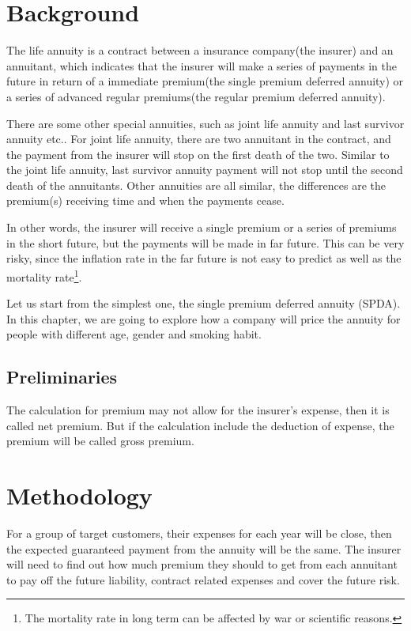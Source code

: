\documentclass{report}
\begin{document}
\section{Background}

The life annuity is a contract between a insurance company(the insurer) and an annuitant\cite{bib:annuity-def}, which indicates that the insurer will make a series of payments in the future in return of a immediate premium(the single premium deferred annuity) or a series of advanced regular premiums(the regular premium deferred annuity). 


There are some other special annuities, such as joint life annuity and last survivor annuity etc.. For joint life annuity, there are two annuitant in the contract, and the payment from the insurer will stop on the first death of the two. Similar to the joint life annuity, last survivor annuity payment will not stop until the second death of the annuitants. Other annuities are all similar, the differences are the premium(s) receiving time and when the payments cease. 


In other words, the insurer will receive a single premium or a series of premiums in the short future, but the payments will be made in far future. This can be very risky, since the inflation rate in the far future is not easy to predict as well as the mortality rate\footnote{The mortality rate in long term can be affected by war or scientific reasons.}.

Let us start from the simplest one, the single premium deferred annuity (SPDA). In this chapter, we are going to explore how a company will price the annuity for people with different age, gender and smoking habit.


\subsection{Preliminaries}

The calculation for premium may not allow for the insurer's expense, then it is called net premium. But if the calculation include the deduction of expense, the premium will be called gross premium.





\section{Methodology}


For a group of target customers, their expenses for each year will be close, then the expected guaranteed payment from the annuity will be the same. The insurer will need to find out how much premium they should to get from each annuitant to pay off the future liability, contract related expenses and cover the future risk.
\end{document}
